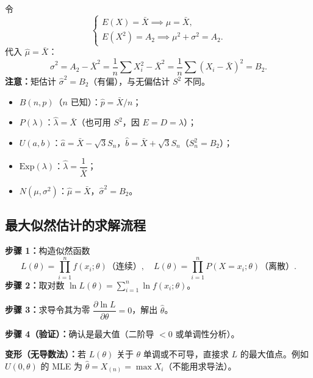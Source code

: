 \documentclass[11pt,a4paper]{article}
\begin{document}
\begin{derivation}
令
\[
\begin{cases}
E(X) = \bar X \implies \mu = \bar X, \\
E(X^2) = A_2 \implies \mu^2+\sigma^2 = A_2.
\end{cases}
\]
代入 $\hat\mu=\bar X$：
\[
\hat\sigma^2 = A_2 - \bar X^2 = \frac{1}{n}\sum X_i^2 - \bar X^2 = \frac{1}{n}\sum(X_i-\bar X)^2 = B_2.
\]
\textbf{注意：}矩估计 $\hat\sigma^2=B_2$（有偏），与无偏估计 $S^2$ 不同。
\end{derivation}

\begin{examtip}[常见分布的矩估计]
\begin{itemize}[leftmargin=2em]
  \item $B(n,p)$（$n$ 已知）：$\hat p=\bar X/n$；
  \item $P(\lambda)$：$\hat\lambda=\bar X$（也可用 $S^2$，因 $E=D=\lambda$）；
  \item $U(a,b)$：$\hat a=\bar X-\sqrt{3}S_n$，$\hat b=\bar X+\sqrt{3}S_n$（$S_n^2=B_2$）；
  \item $\mathrm{Exp}(\lambda)$：$\hat\lambda=\dfrac{1}{\bar X}$；
  \item $N(\mu,\sigma^2)$：$\hat\mu=\bar X$，$\hat\sigma^2=B_2$。
\end{itemize}
\end{examtip}

\subsection{最大似然估计的求解流程}

\begin{variation}
\textbf{步骤 1：}构造似然函数
\[
L(\theta) = \prod_{i=1}^n f(x_i;\theta) \text{（连续）}, \quad L(\theta)=\prod_{i=1}^n P(X=x_i;\theta) \text{（离散）}.
\]
\textbf{步骤 2：}取对数 $\ln L(\theta)=\sum_{i=1}^n \ln f(x_i;\theta)$。

\textbf{步骤 3：}求导令其为零 $\dfrac{\partial\ln L}{\partial\theta}=0$，解出 $\hat\theta$。

\textbf{步骤 4（验证）：}确认是最大值（二阶导 $<0$ 或单调性分析）。

\textbf{变形（无导数法）：}若 $L(\theta)$ 关于 $\theta$ 单调或不可导，直接求 $L$ 的最大值点。例如 $U(0,\theta)$ 的 MLE 为 $\hat\theta=X_{(n)}=\max X_i$（不能用求导法）。
\end{variation}
\end{document}
